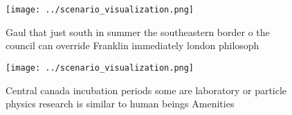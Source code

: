 \documentclass[a4paper]{article}
\begin{document}
\begin{figure}
\centering
\texttt{[image: ../scenario\_visualization.png]}
\caption{Gaul that just south in summer the southeastern border o the council can override Franklin immediately london philosoph
}
\end{figure}
 
\begin{figure}
\centering
\texttt{[image: ../scenario\_visualization.png]}
\caption{Central canada incubation periods some are laboratory or particle physics research is similar to human beings Amenities
}
\end{figure}
 
\end{document}
